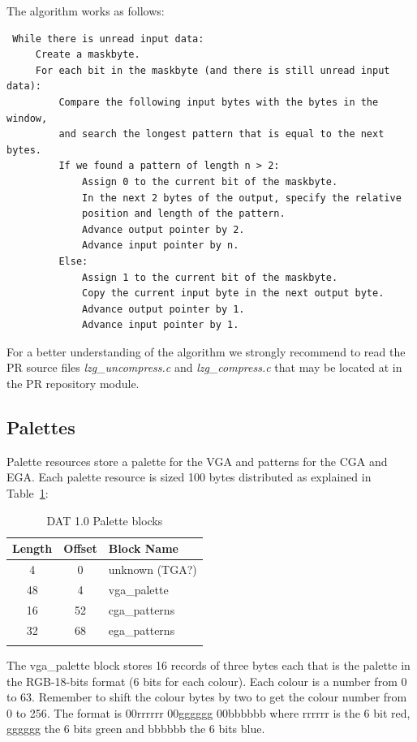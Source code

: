 \documentclass{article}
\begin{document}
\pagebreak[2]
 The algorithm works as follows:\\
{\small
\begin{verbatim}
 While there is unread input data:
     Create a maskbyte.
     For each bit in the maskbyte (and there is still unread input data):
         Compare the following input bytes with the bytes in the window,
         and search the longest pattern that is equal to the next bytes.
         If we found a pattern of length n > 2:
             Assign 0 to the current bit of the maskbyte.
             In the next 2 bytes of the output, specify the relative
             position and length of the pattern.
             Advance output pointer by 2.
             Advance input pointer by n.
         Else:
             Assign 1 to the current bit of the maskbyte.
             Copy the current input byte in the next output byte.
             Advance output pointer by 1.
             Advance input pointer by 1.
\end{verbatim}
}
\pagebreak[2]

 For a better understanding of the algorithm we strongly recommend to read
 the   PR source files {\it lzg\_uncompress.c} and {\it lzg\_compress.c} that may be
 located at
 {\fontsize{6}{6}\selectfont {\it https://gforge.lug.fi.uba.ar/plugins/scmcvs/cvsweb.php/PR/src/lib/compression/?cvsroot=freeprince}}
 in the PR repository module.

\pagebreak[3]
\subsection{Palettes}
 Palette resources store a palette for the  VGA and patterns for the  CGA and
  EGA. Each palette resource is sized 100 bytes distributed as explained in Table~\ref{palettes table}:

\renewcommand{\tabcolsep}{1em}
\begin{longtable}{ccl}
 \hline
  Length & Offset & Block Name \\
 \hline
  4     & 0      & unknown (TGA?) \\
  48    & 4      & vga\_palette \\
  16    & 52     & cga\_patterns \\
  32    & 68     & ega\_patterns \\
 \hline
 \caption{DAT 1.0 Palette blocks}
 \label{palettes table}
\end{longtable}

\pagebreak[2]
 The vga\_palette block stores 16 records of three bytes each that is the
 palette in the RGB-18-bits format (6 bits for each colour). Each colour is
 a number from 0 to 63. Remember to shift the colour bytes by two to get
 the colour number from 0 to 256. The format is 00rrrrrr 00gggggg 00bbbbbb
 where rrrrrr is the 6 bit red, gggggg the 6 bits green and bbbbbb the 6
 bits blue.
\end{document}
